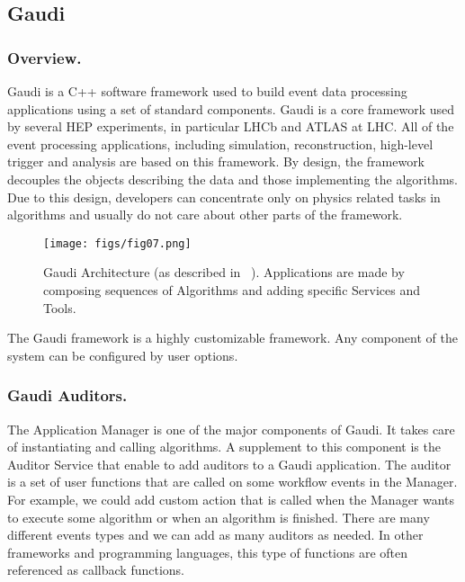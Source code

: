 \documentclass[a4paper]{jpconf}
\begin{document}
\subsection{Gaudi}

\subsubsection{Overview.}

Gaudi is a C++ software framework used to build event data processing applications using a set of standard components.  
Gaudi is a core framework used by several HEP experiments, in particular LHCb and ATLAS at LHC. 
All of the event processing applications, including simulation, reconstruction, high-level trigger and analysis 
are based on this framework. By design, the framework decouples the objects  describing the data and those 
implementing the algorithms. Due to this design,  developers can concentrate only on  physics related tasks 
in algorithms and usually do not care about other parts of the framework. 

\begin{figure}[H]
\begin{minipage}{\textwidth}
\texttt{[image: figs/fig07.png]}
\caption{\label{fig07}Gaudi Architecture (as described in ~\cite{gaudi}). Applications are made by composing sequences of Algorithms and adding 
specific Services and Tools.}
\end{minipage}
\end{figure}

The Gaudi framework is a highly customizable framework. Any component of the system can be configured by user options. 

\subsubsection{Gaudi Auditors.}

The Application Manager is one of the major components of Gaudi. It takes care of instantiating and
 calling algorithms. A supplement to this component  is the Auditor Service that enable to add auditors to a
 Gaudi application. The auditor is a set of user functions that are called on some workflow events in the Manager. 
 For example, we could add custom action that is called when the Manager wants to execute some algorithm or when 
 an algorithm is finished.  There are many different events types and we can add as many auditors as needed. 
 In other frameworks and programming languages, this type of functions are often referenced as callback functions.
\end{document}
